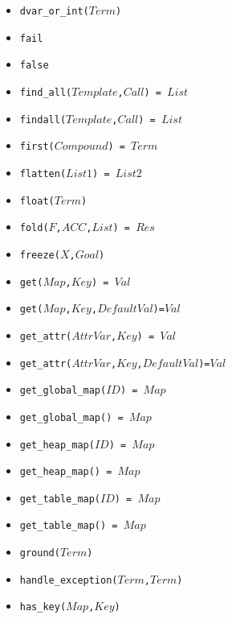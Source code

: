 \documentclass[10pt]{article}
\begin{document}
\begin{multicols}{2}
\begin{scriptsize}
\begin{itemize}
    \item \texttt{dvar\_or\_int($Term$)}
    \item \texttt{fail}
    \item \texttt{false}
    \item \texttt{find\_all($Template$,$Call$) = $List$}
    \item \texttt{findall($Template$,$Call$) = $List$}
    \item \texttt{first($Compound$) = $Term$} 
    \item \texttt{flatten($List1$) = $List2$} 
    \item \texttt{float($Term$)} 
    \item \texttt{fold($F$,$ACC$,$List$) = $Res$} 
    \item \texttt{freeze($X$,$Goal$)}
    \item \texttt{get($Map$,$Key$) = $Val$}
    \item \texttt{get($Map$,$Key$,$DefaultVal$)=$Val$} 
    \item \texttt{get\_attr($AttrVar$,$Key$) = $Val$}
    \item \texttt{get\_attr($AttrVar$,$Key$,$DefaultVal$)=$Val$} 
    \item \texttt{get\_global\_map($ID$) = $Map$}
    \item \texttt{get\_global\_map() = $Map$}
    \item \texttt{get\_heap\_map($ID$) = $Map$} 
    \item \texttt{get\_heap\_map() = $Map$} 
    \item \texttt{get\_table\_map($ID$) = $Map$} 
    \item \texttt{get\_table\_map() = $Map$} 
    \item \texttt{ground($Term$)} 
    \item \texttt{handle\_exception($Term$,$Term$)} 
    \item \texttt{has\_key($Map$,$Key$)} 

\end{itemize}
\end{scriptsize}
\end{multicols}
\end{document}
